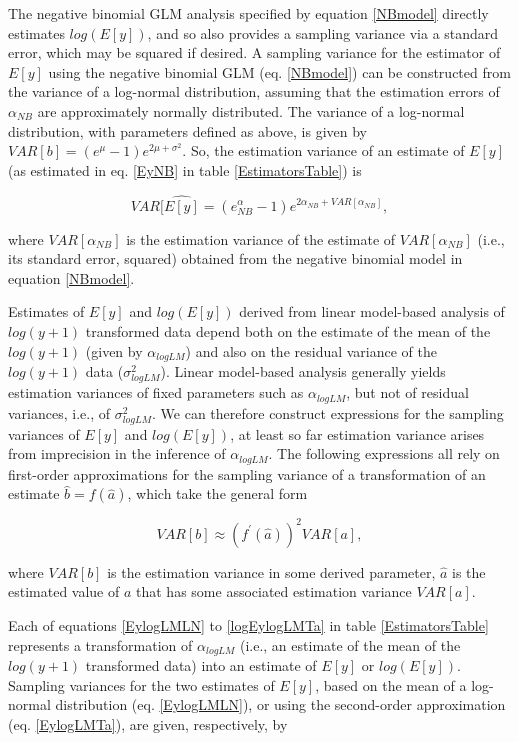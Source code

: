 \documentclass[]{article}
\begin{document}
The negative binomial GLM analysis specified by equation \ref{NBmodel}
directly estimates \(log(E[y])\), and so also provides a sampling
variance via a standard error, which may be squared if desired. A
sampling variance for the estimator of \(E[y]\) using the negative
binomial GLM (eq. \ref{NBmodel}) can be constructed from the variance of
a log-normal distribution, assuming that the estimation errors of
\(\alpha_{NB}\) are approximately normally distributed. The variance of
a log-normal distribution, with parameters defined as above, is given by
\(VAR[b]=(e^\mu-1)e^{2\mu+\sigma^2}\). So, the estimation variance of an
estimate of \(E[y]\) (as estimated in eq. \ref{EyNB} in table
\ref{EstimatorsTable}) is

\begin{equation}\label{SE_EyLMNB}
VAR[\widehat{E[y]}=(e^\alpha_{NB}-1)e^{2\alpha_{NB}+VAR[\alpha_{NB}]},
\end{equation}

where \(VAR[\alpha_{NB}]\) is the estimation variance of the estimate of
\(VAR[\alpha_{NB}]\) (i.e., its standard error, squared) obtained from
the negative binomial model in equation \ref{NBmodel}.

Estimates of \(E[y]\) and \(log(E[y])\) derived from linear model-based
analysis of \(log(y+1)\) transformed data depend both on the estimate of
the mean of the \(log(y+1)\) (given by \(\alpha_{logLM}\)) and also on
the residual variance of the \(log(y+1)\) data (\(\sigma^2_{logLM}\)).
Linear model-based analysis generally yields estimation variances of
fixed parameters such as \(\alpha_{logLM}\), but not of residual
variances, i.e., of \(\sigma^2_{logLM}\). We can therefore construct
expressions for the sampling variances of \(E[y]\) and \(log(E[y])\), at
least so far estimation variance arises from imprecision in the
inference of \(\alpha_{logLM}\). The following expressions all rely on
first-order approximations for the sampling variance of a transformation
of an estimate \(\hat{b} = f(\hat{a})\), which take the general form

\begin{equation}\label{deltaMethod}
VAR[b] \approx (f^\prime(\hat{a}))^2 VAR[a],
\end{equation}

where \(VAR[b]\) is the estimation variance in some derived parameter,
\(\hat{a}\) is the estimated value of \(a\) that has some associated
estimation variance \(VAR[a]\).

Each of equations \ref{EylogLMLN} to \ref{logEylogLMTa} in table
\ref{EstimatorsTable} represents a transformation of \(\alpha_{logLM}\)
(i.e., an estimate of the mean of the \(log(y+1)\) transformed data)
into an estimate of \(E[y]\) or \(log(E[y])\). Sampling variances for
the two estimates of \(E[y]\), based on the mean of a log-normal
distribution (eq. \ref{EylogLMLN}), or using the second-order
approximation (eq. \ref{EylogLMTa}), are given, respectively, by
\end{document}
